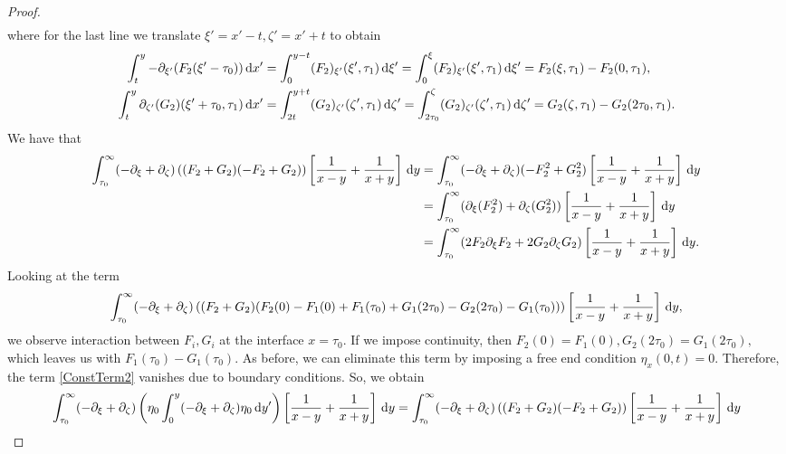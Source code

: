 \documentclass[10pt,reqno,oneside,a4paper, landscape]{article}
\begin{document}
\begin{proof}
\begin{align*}
\end{align*}
where for the last line we translate $\xi' = x'-t, \zeta' = x'+t$ to obtain
\begin{align*}
 \int^{y}_{t} -\partial_{\xi'}(F_2(\xi' - \tau_0 )) \,\mathrm{d} x' &=  \int^{y-t}_{0}(F_2)_{\xi'}(\xi', \tau_1) \,\mathrm{d} \xi' =\int^{\xi}_{0}(F_2)_{\xi'}(\xi', \tau_1) \,\mathrm{d} \xi' = F_2(\xi, \tau_1) - F_2(0, \tau_1), \\
\int^{y}_{t} \partial_{\zeta'}(G_2)(\xi'+\tau_0, \tau_1) \,\mathrm{d} x' &=  \int^{y+t}_{2t}(G_2)_{\zeta'}(\zeta', \tau_1) \,\mathrm{d} \zeta' = \int^{\zeta}_{2\tau_0}(G_2)_{\zeta'}(\zeta', \tau_1) \,\mathrm{d} \zeta' = G_2(\zeta, \tau_1) - G_2(2\tau_0, \tau_1).
\end{align*}
We have that 
\begin{align*}
\int_{\tau_0}^\infty  (- \partial_\xi + \partial_\zeta)\left( (F_2 + G_2) (- F_2 + G_2) \right) \left[ \frac{1}{x-y} + \frac{1}{x+y} \right] \,\mathrm{d} y &= \int_{\tau_0}^\infty  (- \partial_\xi + \partial_\zeta)(-F_2^2 + G_2^2)\left[ \frac{1}{x-y} + \frac{1}{x+y} \right] \,\mathrm{d} y \\
&= \int_{\tau_0}^\infty (\partial_\xi (F_2^2) + \partial_\zeta(G_2^2) )\left[ \frac{1}{x-y} + \frac{1}{x+y} \right] \,\mathrm{d} y \\
&= \int_{\tau_0}^\infty (2 F_2 \partial_\xi F_2 + 2 G_2 \partial_\zeta G_2 )\left[ \frac{1}{x-y} + \frac{1}{x+y} \right] \,\mathrm{d} y.
\end{align*}
Looking at the term
\begin{equation}\label{ConstTerm2}
 \int_{\tau_0}^\infty (- \partial_\xi + \partial_\zeta)\left( (F_2 + G_2) (F_2(0) - F_1(0)  + F_1(\tau_0)  + G_1(2\tau_0) - G_2(2\tau_0) - G_1(\tau_0) ) \right) \left[ \frac{1}{x-y} + \frac{1}{x+y} \right] \,\mathrm{d} y,
\end{equation}
we observe interaction between $F_i, G_i$ at the interface $x= \tau_0.$ If we impose continuity, then $F_2(0) = F_1(0), G_2(2\tau_0) = G_1(2\tau_0),$ which leaves us with $F_1(\tau_0)- G_1(\tau_0).$ As before, we can eliminate this term by imposing a free end condition $\eta_x(0,t) = 0.$ Therefore, the term \eqref{ConstTerm2} vanishes due to boundary conditions. So, we obtain
\begin{align*} 
\int_{\tau_0}^\infty (- \partial_\xi + \partial_\zeta)\left( \eta_0 \int^{y}_0 (- \partial_\xi + \partial_\zeta)\eta_0 \D y' \right) \left[ \frac{1}{x-y} + \frac{1}{x+y} \right] \D y &= \int_{\tau_0}^\infty  (- \partial_\xi + \partial_\zeta)\left( (F_2 + G_2) (- F_2 + G_2) \right) \left[ \frac{1}{x-y} + \frac{1}{x+y} \right] \D y \\

\end{align*}
\end{proof}
\end{document}
